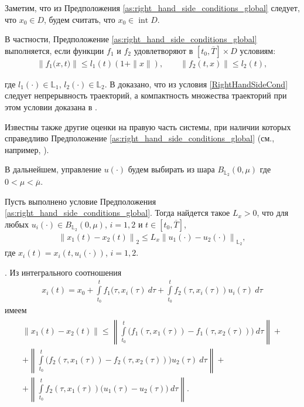 \documentclass[../main.tex]{subfiles}
\begin{document}
	Заметим, что из Предположения  \ref{as:right_hand_side_conditions_global} следует, что $x_0 \in D$, будем считать, что $x_0 \in \operatorname{int} D$.

	В частности, Предположение \ref{as:right_hand_side_conditions_global} выполняется, если  функции $f_1$ и $f_2$ удовлетворяют в $ [t_0, \overline{T}] \times D$ условиям:
	\begin{gather}\label{RightHandSideCond}
		\left\|f_1\big(x,t\big) \right\| \leqslant l_1(t) (1 + \|x\|), \qquad  \left\| f_2(t,x) \right\| \leqslant l_2(t), 
	\end{gather}
	
	где $ l_1(\cdot) \in  \mathbb{L}_1$, $ l_2(\cdot) \in  \mathbb{L}_2$. В \cite[Теорема 5]{Fillipov2} доказано, что из условия \eqref{RightHandSideCond} следует непрерывность траекторий, а компактность множества траекторий при этом условии доказана в \cite[Утверждение 2]{GusZyk}.
	
	Известны также другие  оценки на правую часть системы, при наличии которых справедливо Предположение  \ref{as:right_hand_side_conditions_global} (см., например, \cite{Fillipov2, Guseinov}).
	
	В дальнейшем, управление $ u(\cdot) $ будем выбирать из шара $ B_{\mathbb{L}_2}(0,\mu) $ где $ 0 < \mu < \overline{\mu} $.
	
	\begin{lemma}\label{lem:Lip_of_solutions_global}
			Пусть выполнено условие Предположения \ref{as:right_hand_side_conditions_global}. Тогда найдется такое $L_x > 0$, что для любых $u_i(\cdot) \in B_{\mathbb{L}_2}(0,\mu) $, $i = 1,2$ и $t \in [t_0, \overline{T}]$, 
			\begin{gather}
			\left\| x_1(t) - x_2(t) \right\|_2 \leqslant L_x \left\|u_1(\cdot) - u_2(\cdot) \right\|_{\mathbb{L}_2}, 
			\end{gather}
		где $x_i(t) = x_i(t,u_i(\cdot))$, $i = 1,2$. 
	\end{lemma}
	\doc. 
	Из интегрального соотношения
	\begin{gather*}
		 x_i(t) = x_0 + \int\limits_{t_0}^{t} f_1(\tau, x_i(\tau)\ d\tau + \int\limits_{t_0}^{t} f_2(\tau,x_i(\tau))u_i(\tau)\ d\tau 
	\end{gather*}
	имеем 
	\begin{gather}\label{diff_of_solution}
		\begin{gathered}
		\| x_1(t) - x_2(t) \| \leqslant 
		\left\|  \int\limits_{t_0}^{t} \Big( f_1(\tau, x_1(\tau)) - f_1(\tau, x_2(\tau)) \Big) \ d\tau \right\| +  \\ + 
		\left\|  \int\limits_{t_0}^{t} \Big( f_2(\tau, x_1(\tau)) - f_2(\tau,x_2(\tau)) \Big) u_2(\tau) \ d\tau \right\| + \\ +
		\left\|  \int\limits_{t_0}^{t} f_2(\tau,x_1(\tau)) \big( u_1(\tau) - u_2(\tau) \big) \ d\tau \right\|. 
		\end{gathered}
	\end{gather}
	
\end{document}
